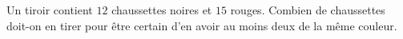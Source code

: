 
\begin{exercice}\label{exosmath-0191}

Un tiroir contient \( 12\) chaussettes noires et \( 15\) rouges. Combien de chaussettes doit-on en tirer pour être certain d'en avoir au moins deux de la même couleur.

\end{exercice}
